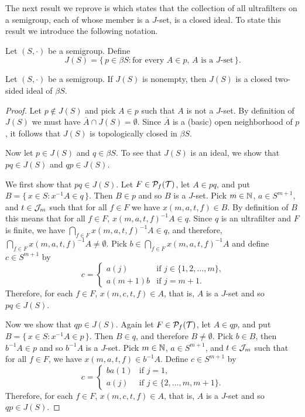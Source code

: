The next result we reprove is \cite[Theorem 3.4]{De:2008uq} which states that the collection of all ultrafilters on a semigroup, each of whose member is a $J$-set, is a closed ideal.
To state this result we introduce the following notation.

\begin{defn}
  Let $(S, \cdot)$ be a semigroup. 
  Define
  \[
    J(S) = \{\, p \in \beta S : \mbox{for every $A \in p$, $A$ is a $J$-set} \,\}.
  \]
\end{defn}

\begin{thm}
  Let $(S, \cdot)$ be a semigroup.
  If $J(S)$ is nonempty, then $J(S)$ is a closed two-sided ideal of $\beta S$.
\end{thm}
\begin{proof}
  Let $p \not\in J(S)$ and pick $A \in p$ such that $A$ is not a $J$-set.
  By definition of $J(S)$ we must have $\overline{A} \cap J(S) = \emptyset$.
  Since $\overline{A}$ is a (basic) open neighborhood of $p$, it follows that $J(S)$ is topologically closed in $\beta S$.

  Now let $p \in J(S)$ and $q \in \beta S$.
  To see that $J(S)$ is an ideal, we show that $pq \in J(S)$ and $qp \in J(S)$. 

  We first show that $pq \in J(S)$.
  Let $F \in \mathcal{P}_f(\mathcal{T})$, let $A \in pq$, and put $B = \{\, x \in S : x^{-1}A \in q \,\}$.
  Then $B \in p$ and so $B$ is a $J$-set.
  Pick $m \in \mathbb{N}$, $a \in S^{m+1}$, and $t \in \mathcal{J}_m$ such that for all $f \in F$ we have $x(m, a, t, f) \in B$.
  By definition of $B$ this means that for all $f \in F$, $x(m, a, t, f)^{-1}A \in q$. 
  Since $q$ is an ultrafilter and $F$ is finite, we have $\bigcap_{f \in F} x(m, a, t, f)^{-1}A \in q$, and therefore, $\bigcap_{f \in F} x(m, a, t, f)^{-1}A \ne \emptyset$.
  Pick $b \in \bigcap_{f \in F} x(m, a, t, f)^{-1}A$ and define $c \in S^{m+1}$ by
  \[
    c =
    \begin{cases}
      a(j) & \mbox{if $j \in \{1, 2, \ldots, m\}$,} \\
      a(m+1)b & \mbox{if $j = m+1$.}
    \end{cases}
  \]
  Therefore, for each $f \in F$, $x(m, c, t, f) \in A$, that is, $A$ is a $J$-set and so $pq \in J(S)$.

  Now we show that $qp \in J(S)$.
  Again let $F \in \mathcal{P}_f(\mathcal{T})$, let $A \in qp$, and put $B = \{\, x \in S : x^{-1}A \in p \,\}$.
  Then $B \in q$, and therefore $B \ne \emptyset$.
  Pick $b \in B$, then $b^{-1}A \in p$ and so $b^{-1}A$ is a $J$-set.
  Pick $m \in \mathbb{N}$, $a \in S^{m+1}$, and $t \in \mathcal{J}_m$ such that for all $f \in F$, we have $x(m, a, t, f) \in b^{-1}A$.
  Define $c \in S^{m+1}$ by
  \[
    c =
    \begin{cases}
      ba(1) & \mbox{if $j =1$,} \\
      a(j) & \mbox{if $j \in \{2, \ldots, m, m+1\}$.}
    \end{cases}
  \]
  Therefore, for each $f \in F$, $x(m, c, t, f) \in A$, that is, $A$ is a $J$-set and so $qp \in J(S)$.
\end{proof}

